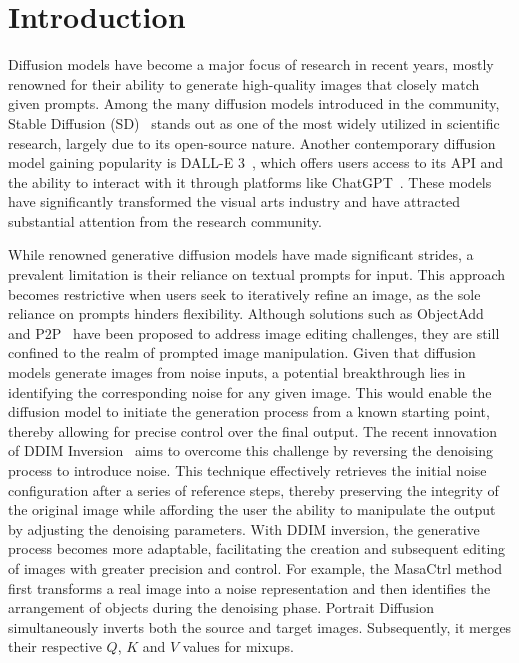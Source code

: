 \documentclass[letterpaper]{article} %
\begin{document}
\section{Introduction}
\label{Intro}
%
%
Diffusion models have become a major focus of research in recent years, mostly renowned for their ability to generate high-quality images that closely match given prompts. Among the many diffusion models introduced in the community, Stable Diffusion (SD)~\cite{rombach2022high} stands out as one of the most widely utilized in scientific research, largely due to its open-source nature. Another contemporary diffusion model gaining popularity is DALL-E 3~\cite{betker2023improving}, which offers users access to its API and the ability to interact with it through platforms like ChatGPT~\cite{chatGPT}.
%
These models have significantly transformed the visual arts industry and have attracted substantial attention from the research community. 
%
%



While renowned generative diffusion models have made significant strides, a prevalent limitation is their reliance on textual prompts for input.
%
This approach becomes restrictive when users seek to iteratively refine an image, as the sole reliance on prompts hinders flexibility.
%
Although solutions such as ObjectAdd~\cite{zhang2024objectadd} and P2P~\cite{hertz2022prompt} have been proposed to address image editing challenges, they are still confined to the realm of prompted image manipulation.
%
Given that diffusion models generate images from noise inputs, a potential breakthrough lies in identifying the corresponding noise for any given image.
%
This would enable the diffusion model to initiate the generation process from a known starting point, thereby allowing for precise control over the final output.
%
The recent innovation of DDIM Inversion~\cite{couairon2023diffedit} aims to overcome this challenge by reversing the denoising process to introduce noise.
%
This technique effectively retrieves the initial noise configuration after a series of reference steps, thereby preserving the integrity of the original image while affording the user the ability to manipulate the output by adjusting the denoising parameters.
%
With DDIM inversion, the generative process becomes more adaptable, facilitating the creation and subsequent editing of images with greater precision and control.
%
For example, the MasaCtrl method~\cite{cao_2023_masactrl} first transforms a real image into a noise representation and then identifies the arrangement of objects during the denoising phase.
%
Portrait Diffusion\cite{liu2023portrait} simultaneously inverts both the source and target images. Subsequently, it merges their respective $Q$, $K$ and $V$ values for mixups.
\end{document}

